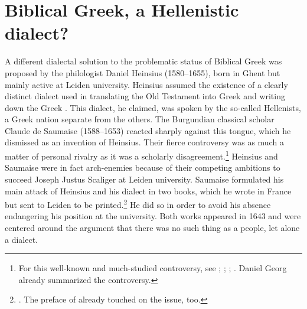 \section{Biblical Greek, a Hellenistic dialect?}\label{sec:4.6}

A different dialectal solution to the problematic status of Biblical Greek was proposed by the philologist Daniel Heinsius (1580–1655), born in Ghent but mainly active at Leiden university. Heinsius assumed the existence of a clearly distinct dialect used in translating the  Old Testament into Greek and writing down the Greek . This dialect, he claimed, was spoken by the so-called Hellenists, a Greek nation separate from the others. The Burgundian classical scholar Claude de Saumaise (1588–1653) reacted sharply against this  tongue, which he dismissed as an invention of Heinsius. Their fierce controversy was as much a matter of personal rivalry as it was a scholarly disagreement.\footnote{For this well-known and much-studied controversy, see \citet[32--34]{De1980}; \citet[391--392]{Muller1984}; \citet{Considine2010}; \citet[350--351]{VanHal2010a}. Daniel Georg \citet[\textsc{ii.}74–77]{Morhof1708} already summarized the controversy.} Heinsius and Saumaise were in fact arch-enemies because of their competing ambitions to succeed Joseph Justus Scaliger at Leiden university. Saumaise formulated his main attack of Heinsius and his  dialect in two books, which he wrote in France but sent to Leiden to be printed.\footnote{\citet[]{Saumaise1643a, Saumaise1643}. The preface of \citet{Saumaise1639} already touched on the issue, too.} He did so in order to avoid his absence endangering his position at the university. Both works appeared in 1643 and were centered around the argument that there was no such thing as a  people, let alone a  dialect.

